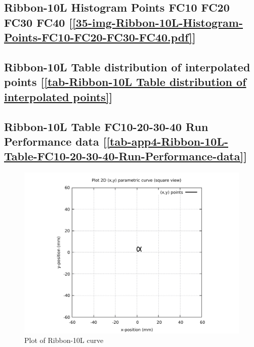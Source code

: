 \subsection       {Ribbon-10L Histogram Points FC10 FC20 FC30 FC40
	[\ref      {35-img-Ribbon-10L-Histogram-Points-FC10-FC20-FC30-FC40.pdf}] }
\label{ssec-35-img-Ribbon-10L-Histogram-Points-FC10-FC20-FC30-FC40.pdf}

\subsection    {Ribbon-10L Table distribution of interpolated points
	[\ref      {tab-Ribbon-10L Table distribution of interpolated points}] }
\label{ssec-tab-Ribbon-10L Table distribution of interpolated points}

\subsection         {Ribbon-10L Table FC10-20-30-40 Run Performance data
	[\ref      {tab-app4-Ribbon-10L-Table-FC10-20-30-40-Run-Performance-data}] }
\label{ssec-tab-app4-Ribbon-10L-Table-FC10-20-30-40-Run-Performance-data}


\clearpage
\pagebreak

\begin{figure}
	\caption     {Plot of Ribbon-10L curve}
	\label{01-img-Plot of Ribbon-10L curve.pdf}
	\includegraphics[width=1.00\textwidth]{Chap4/appendix/app-Ribbon-10L/plots/01-img-Plot of Ribbon-10L curve.pdf}
\end{figure}	


